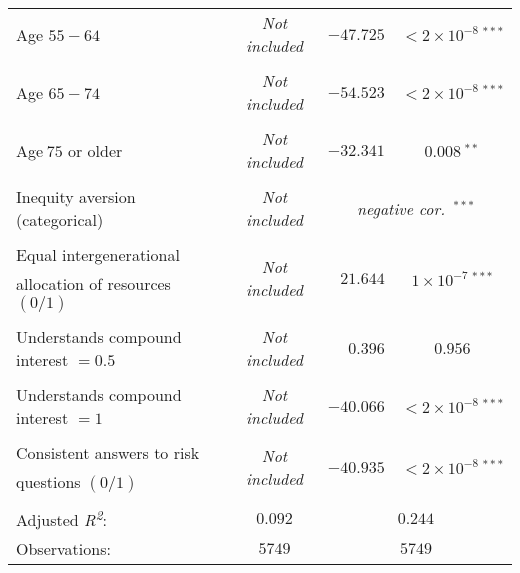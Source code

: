 \documentclass[a4paper,12pt]{article}
\begin{document}
{\begin{threeparttable}
\begin{small}
\begin{tabular}{lrcrc}
        \\ 
  \vspace{-0.2cm}Age $55-64$&\multicolumn{2}{c}{\textit{Not included}}&$-47.725$&$<2\times10^{-8}~^{***}$\\
        \\       
 \vspace{-0.2cm}Age $65-74$&\multicolumn{2}{c}{\textit{Not included}}&$-54.523$&$<2\times10^{-8}~^{***}$\\
        \\ 
 \vspace{-0.2cm}Age$~75$ or older&\multicolumn{2}{c}{\textit{Not included}}&$-32.341$&$0.008~^{**}$\\
        \\       
  \vspace{-0.2cm}Inequity aversion (categorical)\tnote{b}&\multicolumn{2}{c}{\textit{Not included}}&\multicolumn{2}{c}{\textit{negative cor.~}$^{***}$}\\
      \\
 Equal intergenerational&\multicolumn{2}{c}{\multirow{2}{*}{\textit{Not included}}}&\multirow{2}{*}{$21.644$}&\multirow{2}{*}{$1\times10^{-7}~^{***}$}\\
\vspace{-0.2cm}\hspace{0.6cm}allocation of resources $(0/1)$&\\
 \\  
\vspace{-0.2cm}Understands compound interest $=0.5$&\multicolumn{2}{c}{\textit{Not included}}&$0.396$&$0.956$\\
  \\
\vspace{-0.2cm}Understands compound interest $=1$&\multicolumn{2}{c}{\textit{Not included}}&$-40.066$&$<2\times10^{-8}~^{***}$\\
  \\
  Consistent answers to risk&\multicolumn{2}{c}{\multirow{2}{*}{\textit{Not included}}}&\multirow{2}{*}{$-40.935$}&\multirow{2}{*}{$<2\times10^{-8}~^{***}$}\\
\hspace{0.6cm}questions $(0/1)$&& &
     \\
\hline  \vspace{-0.2cm}
  \\
Adjusted \textit{R\textsuperscript2}:&\multicolumn{2}{c}{$0.092$}&\multicolumn{2}{c}{$0.244$}\\
 Observations:&\multicolumn{2}{c}{$5749$}&\multicolumn{2}{c}{$5749$}\\

\end{tabular}
\end{small}
\end{threeparttable}}
\end{document}

